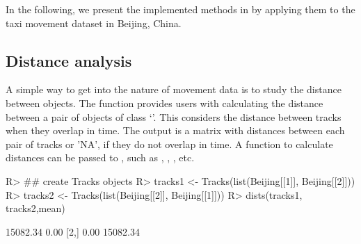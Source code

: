 \documentclass[article]{jss}
\newcommand{\class}[1]{`\code{#1}'}
\begin{document}
  In the following, we present the implemented methods in  by applying them to the taxi movement dataset in Beijing, China. 
\subsection{Distance analysis}\label{distanal}
  A simple way to get into the nature of movement data is to study the distance between objects. The function  provides users with calculating the distance between a pair of objects of class \class{Tracks}. This considers the distance between tracks when they overlap in time. The output is a matrix with distances between each pair of tracks or 'NA', if they do not overlap in time. A function to calculate distances can be passed to , such as , , , etc.

\begin{Sinput}
R> ## create Tracks objects
R> tracks1 <- Tracks(list(Beijing[[1]], Beijing[[2]]))
R> tracks2 <- Tracks(list(Beijing[[2]], Beijing[[1]]))
R> dists(tracks1, tracks2,mean)
\end{Sinput}
\begin{Soutput}
         [,1]     [,2]
[1,] 15082.34     0.00
[2,]     0.00 15082.34
\end{Soutput}
\end{document}
